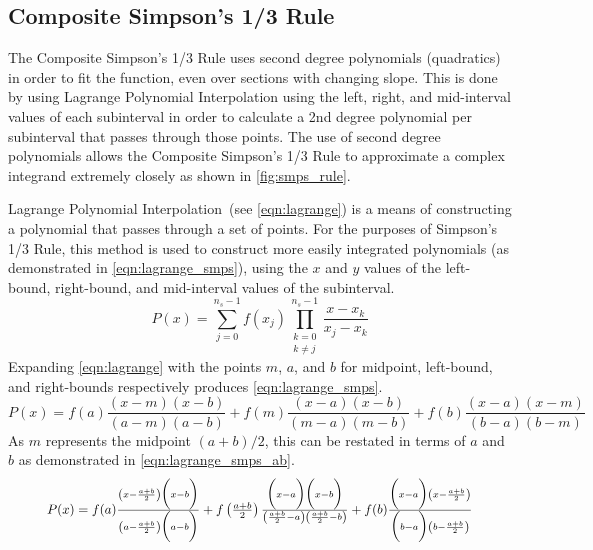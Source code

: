 \documentclass{paper}
\begin{document}
\subsection{Composite Simpson's 1/3 Rule}
\label{sec:smps_rule}
The Composite Simpson's 1/3 Rule uses second degree polynomials (quadratics) in order to fit the function, even over sections with changing slope.
This is done by using Lagrange Polynomial Interpolation using the left, right, and mid-interval values of each subinterval in order to calculate a 2nd degree polynomial per subinterval that passes through those points.
The use of second degree polynomials allows the Composite Simpson's 1/3 Rule to approximate a complex integrand extremely closely as shown in \cref{fig:smps_rule}.
%

%
Lagrange Polynomial Interpolation~(see \cref{eqn:lagrange}) is a means of constructing a polynomial that passes through a set of points.
For the purposes of Simpson's 1/3 Rule, this method is used to construct more easily integrated polynomials (as demonstrated in \cref{eqn:lagrange_smps}), using the \(x\) and \(y\) values of the left-bound, right-bound, and mid-interval values of the subinterval.
%
\begin{equation}
    \label{eqn:lagrange}
    P(x) = \sum_{j=0}^{n_s-1} f(x_j) \prod_{\substack{k = 0 \\ k \neq j}}^{n_s-1} \frac{x - x_k}{x_j - x_k}
\end{equation}
%
Expanding \cref{eqn:lagrange} with the points \(m\), \(a\), and \(b\) for midpoint, left-bound, and right-bounds respectively produces \cref{eqn:lagrange_smps}.
%
\begin{equation}
    \label{eqn:lagrange_smps}
    P(x) = f(a) \frac{(x - m)(x - b)}{(a - m)(a - b)} + f(m) \frac{(x - a)(x - b)}{(m - a)(m - b)} + f(b) \frac{(x - a)(x - m)}{(b - a)(b - m)}
\end{equation}
%
As \(m\) represents the midpoint \((a + b) / 2\), this can be restated in terms of \(a\) and \(b\) as demonstrated in \cref{eqn:lagrange_smps_ab}.
%
\begin{equation}
    \label{eqn:lagrange_smps_ab}
    \resizebox{.9\textwidth}{!} 
    {
    $P(x) = f(a) \frac{\left(x - \frac{a+b}{2}\right)\biggl(x - b\biggr)}{\left(a - \frac{a+b}{2}\right)\biggl(a - b\biggr)} + f\left(\frac{a+b}{2}\right) \frac{\biggl(x - a\biggr)\biggl(x - b\biggr)}{\left(\frac{a+b}{2} - a\right)\left(\frac{a+b}{2} - b\right)} + f(b) \frac{\biggl(x - a\biggr)\left(x - \frac{a+b}{2}\right)}{\biggl(b - a\biggr)\left(b - \frac{a+b}{2}\right)}$
    }
\end{equation}
\end{document}
